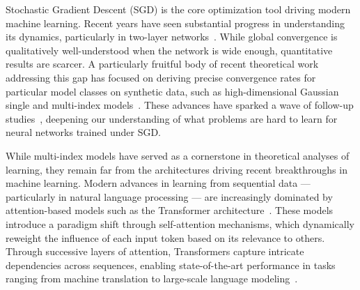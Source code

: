 Stochastic Gradient Descent (SGD) is the core optimization tool driving modern machine learning. Recent years have seen substantial progress in understanding its dynamics, particularly in two-layer networks~\citep{saad1995line,mei2018mean,chizat2018global,rotskoff2022trainability,sirignano2020mean,arnaboldi2023high}. While global convergence is qualitatively well-understood when the network is wide enough, quantitative results are scarcer. A particularly fruitful body of recent theoretical work addressing this gap has focused on deriving precise convergence rates for particular model classes on synthetic data, such as high-dimensional  Gaussian single and multi-index models~\citep{arous2021online,abbe2022merged,abbe2023sgd}. These advances have sparked a wave of follow-up studies~\citep{damian2022neural,damian2023smoothing,bietti2023learning,ba2023learning,moniri2023theory,mousavihosseini2023gradient,cui2024asymptotics,zweig2023symmetric,berthier2023learning,arnaboldi2024escaping,arnaboldi2024online}, deepening our understanding of what problems are hard to learn for neural networks trained under SGD.


While multi-index models have served as a cornerstone in theoretical analyses of learning, they remain far from the architectures driving recent breakthroughs in machine learning. Modern advances in learning from sequential data --- particularly in natural language processing --- are increasingly dominated by attention-based models such as the Transformer architecture~\citep{vaswani2017attention}. These models introduce a paradigm shift through self-attention mechanisms, which dynamically reweight the influence of each input token based on its relevance to others. Through successive layers of attention, Transformers capture intricate dependencies across sequences, enabling state-of-the-art performance in tasks ranging from machine translation to large-scale language modeling~\citep{brown2020language,kenton2019bert}.

